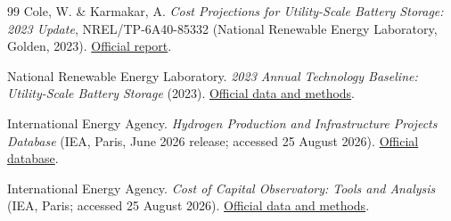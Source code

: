 \documentclass[11pt,a4paper]{article}
\begin{document}
\begin{thebibliography}{99}
Cole, W. \& Karmakar, A. \emph{Cost Projections for Utility-Scale Battery Storage: 2023 Update}, NREL/TP-6A40-85332 (National Renewable Energy Laboratory, Golden, 2023). \href{https://www.nrel.gov/docs/fy23osti/85332.pdf}{Official report}.

National Renewable Energy Laboratory. \emph{2023 Annual Technology Baseline: Utility-Scale Battery Storage} (2023). \href{https://atb.nrel.gov/Electricity/2023/2023/utility-scale_battery_storage}{Official data and methods}.

International Energy Agency. \emph{Hydrogen Production and Infrastructure Projects Database} (IEA, Paris, June 2026 release; accessed 25 August 2026). \href{https://www.iea.org/data-and-statistics/data-product/hydrogen-production-and-infrastructure-projects-database}{Official database}.

International Energy Agency. \emph{Cost of Capital Observatory: Tools and Analysis} (IEA, Paris; accessed 25 August 2026). \href{https://www.iea.org/reports/cost-of-capital-observatory/tools-and-analysis}{Official data and methods}.

\end{thebibliography}
\end{document}
